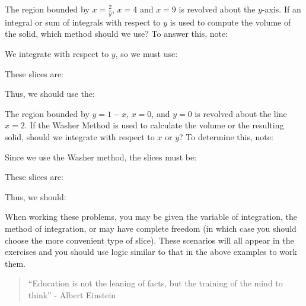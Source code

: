 \documentclass{ximera}
\begin{document}
\begin{example}
The region bounded by $x=\frac{2}{y}$, $x=4$ and $x=9$ is revolved about the $y$-axis.  If an integral or sum of integrals with respect to $y$ is used to compute the volume of the solid, which method should we use?  To answer this, note:
 
We integrate with respect to $y$, so we must use:
\begin{multipleChoice}
\end{multipleChoice}

These slices are:

\begin{multipleChoice}
\end{multipleChoice}

Thus, we should use the:
\begin{multipleChoice}
\end{multipleChoice}
\end{example}

\begin{example}

The region bounded by $y=1-x$, $x=0$, and $y=0$ is revolved about the line $x=2$.  If the Washer Method is used to calculate the volume or the resulting solid, should we integrate with respect to $x$ or $y$?  To determine this, note:
 
 Since we use the Washer method, the slices must be:
\begin{multipleChoice}
\end{multipleChoice}

These slices are:
\begin{multipleChoice}
\end{multipleChoice}

Thus, we should:
\begin{multipleChoice}
\end{multipleChoice}
\end{example}

When working these problems, you may be given the variable of integration, the method of integration, or may have complete freedom (in which case you should choose the more convenient type of slice).  These scenarios will all appear in the exercises and you should use logic similar to that in the above examples to work them.

\begin{quote}
``Education is not the leaning of facts, but the training of the mind to think'' - Albert Einstein
\end{quote}
\end{document}
